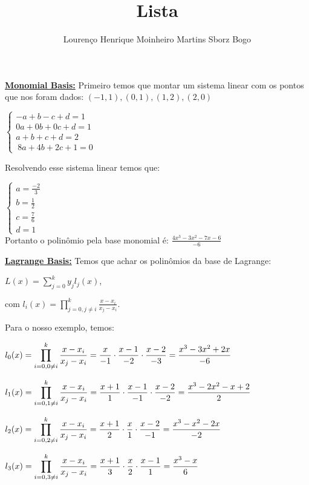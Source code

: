 \documentclass[12pt]{article}
\title{Lista}
\author{Lourenço Henrique Moinheiro Martins Sborz Bogo}
\date{}
\newcommand{\product}[3]{\displaystyle\prod_{#1}^#2 #3}
\newcommand{\gsum}[3]{\displaystyle\sum_{#1}^#2 #3}
\newcommand{\mytitle}[1]{\textbf{\underline{#1}}}
\begin{document}
\maketitle

\mytitle{Monomial Basis:}
Primeiro temos que montar um sistema linear com os pontos que nos foram dados: $(-1, 1), (0, 1), (1, 2), (2, 0)$

$
\begin{cases}
  -a+b-c+d = 1\\
  0a+0b+0c+d = 1\\
  a+b+c+d = 2\\\
  8a+4b+2c+1 = 0
\end{cases}
$


Resolvendo esse sistema linear temos que:

$
\begin{cases}
  a = \frac{-2}{3}\\
  b = \frac{1}{2}\\
  c = \frac{7}{6}\\
  d = 1
\end{cases}
$
\\

Portanto o polinômio pela base monomial é: $\frac{4x^3-3x^2-7x-6}{-6}$


\newpage

\mytitle{Lagrange Basis:} Temos que achar os polinômios da base de Lagrange:

$L(x) = \gsum{j=0}{k}{y_jl_j(x)}$,

com $l_i(x) = \product{j=0, j \neq i}{k}{\frac{x-x_i}{x_j-x_i}}$.

Para o nosso exemplo, temos:

$l_0(x) = \product{i=0, 0 \neq i}{k}{\frac{x-x_i}{x_j-x_i}} = \frac{x}{-1} \cdot \frac{x-1}{-2} \cdot \frac{x-2}{-3} = \frac{x^3-3x^2+2x}{-6}\\$

$l_1(x) = \product{i=0, 1 \neq i}{k}{\frac{x-x_i}{x_j-x_i}} = \frac{x+1}{1} \cdot \frac{x-1}{-1} \cdot \frac{x-2}{-2} = \frac{x^3-2x^2-x+2}{2}\\$

$l_2(x) = \product{i=0, 2 \neq i}{k}{\frac{x-x_i}{x_j-x_i}} = \frac{x+1}{2} \cdot \frac{x}{1} \cdot \frac{x-2}{-1} = \frac{x^3-x^2-2x}{-2}\\$

$l_3(x) = \product{i=0, 3 \neq i}{k}{\frac{x-x_i}{x_j-x_i}} = \frac{x+1}{3} \cdot \frac{x}{2} \cdot \frac{x-1}{1} = \frac{x^3-x}{6}\\$
\end{document}
